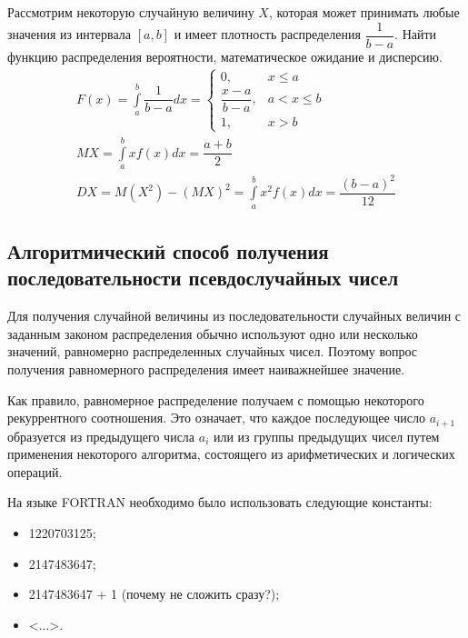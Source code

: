 Рассмотрим некоторую случайную величину $X$, которая может принимать любые значения из интервала $[a, b]$ и имеет плотность распределения $\dfrac{1}{b - a}$. Найти функцию распределения вероятности, математическое ожидание и дисперсию.
%
\begin{gather*}
    F(x) = \int\limits_{a}^b\dfrac{1}{b - a}dx = \begin{cases}
        0,                    & x \leqslant a     \\
        \dfrac{x - a}{b - a}, & a < x \leqslant b \\
        1,                    & x > b
    \end{cases}\\
    MX = \int\limits_{a}^{b}xf(x)dx = \dfrac{a + b}{2}\\
    DX = M(X^2) - (MX)^2 = \int\limits_{a}^{b}x^2f(x)dx = \dfrac{(b - a)^2}{12}
\end{gather*}
%
\subsection{Алгоритмический способ получения последовательности псевдослучайных чисел}

Для получения случайной величины из последовательности случайных величин с заданным законом распределения обычно используют одно или несколько значений, равномерно распределенных случайных чисел. Поэтому вопрос получения равномерного распределения имеет наиважнейшее значение.

Как правило, равномерное распределение получаем с помощью некоторого рекуррентного соотношения. Это означает, что каждое последующее число $a_{i + 1}$ образуется из предыдущего числа $a_i$ или из группы предыдущих чисел путем применения некоторого алгоритма, состоящего из арифметических и логических операций.

На языке FORTRAN необходимо было использовать следующие константы:

\begin{itemize}
    \item 1220703125;
    \item 2147483647;
    \item 2147483647 + 1 (почему не сложить сразу?);
    \item <...>.
\end{itemize}

